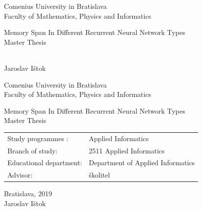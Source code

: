 \documentclass[12pt, oneside]{book}
\def\mfrok{2019}
\def\mfnazov{Memory Span In Different Recurrent Neural Network Types}
\def\mftyp{Master Thesis}
\def\mfautor{Jaroslav Ištok}
\def\mfskolitel{školitel}
\def\mfmiesto{Bratislava, \mfrok}
\def\mfodbor{2511  Applied Informatics}
\def\program{ Applied Informatics }
\def\mfpracovisko{ Department of Applied Informatics }
\begin{document}
     

\thispagestyle{empty}

\begin{center}
\sc\large
 Comenius University in Bratislava\\
 Faculty of Mathematics, Physics and Informatics

\vfill

{
\LARGE\mfnazov}\\
\mftyp

\end{center}

\vfill

{\sc\large 
\noindent \mfrok\\
\mfautor
}

\eject %


\thispagestyle{empty}
\noindent

\begin{center}
\sc  
\large
 Comenius University in Bratislava\\
 Faculty of Mathematics, Physics and Informatics

\vfill

{\LARGE\mfnazov}\\
\mftyp
\end{center}

\vfill

\noindent
\begin{tabular}{ll}
Study programmes : & \program \\
Branch of study: & \mfodbor \\
Educational department: & \mfpracovisko \\
Advisor: & \mfskolitel \\
\end{tabular}

\vfill


\noindent \mfmiesto\\
\mfautor

\eject %




\end{document}
